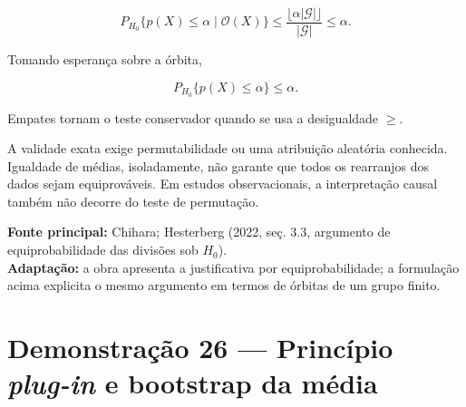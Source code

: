 \documentclass[
  letterpaper,
  DIV=11,
  numbers=noendperiod]{scrreprt}
\begin{document}
\[
P_{H_0}\{p(X)\leq\alpha\mid\mathcal O(X)\}
\leq
\frac{\lfloor\alpha|\mathcal G|\rfloor}{|\mathcal G|}
\leq\alpha.
\]

Tomando esperança sobre a órbita,

\[
P_{H_0}\{p(X)\leq\alpha\}
\leq\alpha.
\]

Empates tornam o teste conservador quando se usa a desigualdade
\(\geq\).

\begin{tcolorbox}[enhanced jigsaw, colback=white, leftrule=.75mm, colbacktitle=quarto-callout-warning-color!10!white, breakable, titlerule=0mm, bottomtitle=1mm, title=\textcolor{quarto-callout-warning-color}{\faExclamationTriangle}\hspace{0.5em}{Condição essencial}, colframe=quarto-callout-warning-color-frame, toprule=.15mm, opacityback=0, bottomrule=.15mm, opacitybacktitle=0.6, arc=.35mm, toptitle=1mm, rightrule=.15mm, coltitle=black, left=2mm]

A validade exata exige permutabilidade ou uma atribuição aleatória
conhecida. Igualdade de médias, isoladamente, não garante que todos os
rearranjos dos dados sejam equiprováveis. Em estudos observacionais, a
interpretação causal também não decorre do teste de permutação.

\end{tcolorbox}

\begin{tcolorbox}[enhanced jigsaw, colback=white, leftrule=.75mm, colbacktitle=quarto-callout-note-color!10!white, breakable, titlerule=0mm, bottomtitle=1mm, title=\textcolor{quarto-callout-note-color}{\faInfo}\hspace{0.5em}{Fonte da demonstração}, colframe=quarto-callout-note-color-frame, toprule=.15mm, opacityback=0, bottomrule=.15mm, opacitybacktitle=0.6, arc=.35mm, toptitle=1mm, rightrule=.15mm, coltitle=black, left=2mm]

\textbf{Fonte principal:} Chihara; Hesterberg (2022, seç. 3.3, argumento
de equiprobabilidade das divisões sob \(H_0\)).\\
\textbf{Adaptação:} a obra apresenta a justificativa por
equiprobabilidade; a formulação acima explicita o mesmo argumento em
termos de órbitas de um grupo finito.

\end{tcolorbox}

\section*{\texorpdfstring{Demonstração 26 --- Princípio \emph{plug-in} e
bootstrap da
média}{Demonstração 26 --- Princípio plug-in e bootstrap da média}}\label{demonstrauxe7uxe3o-26-princuxedpio-plug-in-e-bootstrap-da-muxe9dia}
\end{document}
